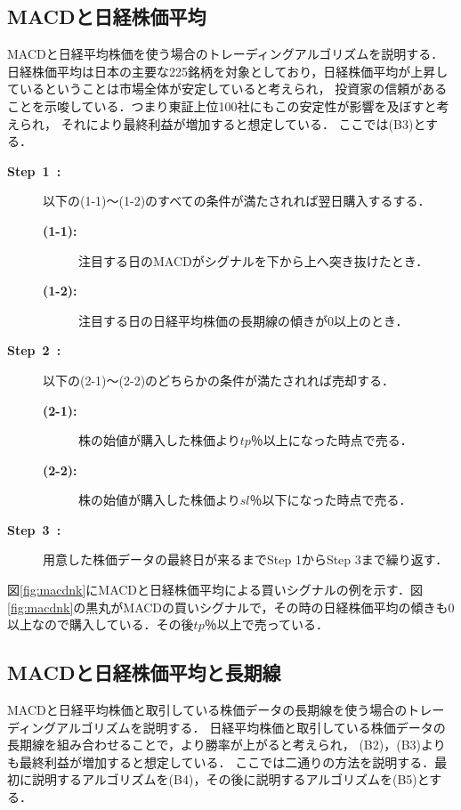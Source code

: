 \subsection{MACDと日経株価平均}
MACDと日経平均株価を使う場合のトレーディングアルゴリズムを説明する．
日経株価平均は日本の主要な225銘柄を対象としており，日経株価平均が上昇しているということは市場全体が安定していると考えられ，
投資家の信頼があることを示唆している．つまり東証上位100社にもこの安定性が影響を及ぼすと考えられ，
それにより最終利益が増加すると想定している．
ここでは(B3)とする．
\begin{description}
  \item[\textbf{Step~1~:}]以下の(1-1)～(1-2)のすべての条件が満たされれば翌日購入するする．
  \begin{description}
    \item[\textbf{(1-1):}]注目する日のMACDがシグナルを下から上へ突き抜けたとき．
    \item[\textbf{(1-2):}]注目する日の日経平均株価の長期線の傾きが0以上のとき．
   \end{description}  
  
  
  \item[\textbf{Step~2~:}]以下の(2-1)～(2-2)のどちらかの条件が満たされれば売却する．
   \begin{description}
    \item[\textbf{(2-1):}]株の始値が購入した株価より$tp$％以上になった時点で売る．
    \item[\textbf{(2-2):}]株の始値が購入した株価より$sl$％以下になった時点で売る． 
   \end{description}
  \item[\textbf{Step~3~:}]用意した株価データの最終日が来るまでStep 1からStep 3まで繰り返す．
  \end{description}
  
   図\ref{fig:macdnk}にMACDと日経株価平均による買いシグナルの例を示す．図\ref{fig:macdnk}の黒丸がMACDの買いシグナルで，その時の日経株価平均の傾きも0以上なので購入している．その後$tp$％以上で売っている．



\subsection{MACDと日経株価平均と長期線}
MACDと日経平均株価と取引している株価データの長期線を使う場合のトレーディングアルゴリズムを説明する．
日経平均株価と取引している株価データの長期線を組み合わせることで，より勝率が上がると考えられ，
(B2)，(B3)よりも最終利益が増加すると想定している．
ここでは二通りの方法を説明する．最初に説明するアルゴリズムを(B4)，その後に説明するアルゴリズムを(B5)とする．


